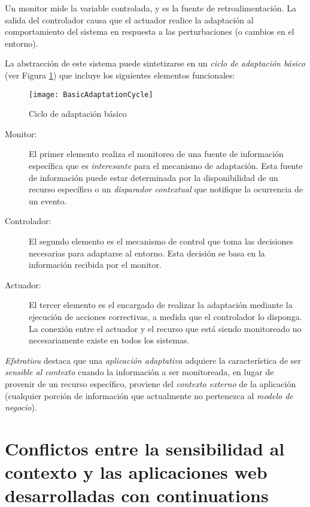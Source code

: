 Un monitor mide la variable controlada, y es la fuente de retroalimentación. La salida del controlador causa que el actuador realice la adaptación al comportamiento del sistema en respuesta a las perturbaciones (o cambios en el entorno).

La abstracción de este sistema puede sintetizarse en un \emph{ciclo de adaptación básico} (ver Figura \ref{BasicAdaptationCycle}) que incluye los siguientes elementos funcionales:

\begin{figure}[ht!]
\centering
\texttt{[image: BasicAdaptationCycle]}
\caption{Ciclo de adaptación básico}
\label{BasicAdaptationCycle}
\end{figure}

\begin{description}
\item[Monitor:] El primer elemento realiza el monitoreo de una fuente de información específica que es \emph{interesante} para el mecanismo de adaptación. Esta fuente de información puede estar determinada por la disponibilidad de un recurso específico o un \emph{disparador contextual} que notifique la ocurrencia de un evento.
\item[Controlador:] El segundo elemento es el mecanismo de control que toma las decisiones necesarias para adaptarse al entorno. Esta decisión se basa en la información recibida por el monitor.
\item[Actuador:] El tercer elemento es el encargado de realizar la adaptación mediante la ejecución de acciones correctivas, a medida que el controlador lo disponga. La conexión entre el actuador y el recurso que está siendo monitoreado no necesariamente existe en todos los sistemas.
\end{description}

\emph{Efstratiou}\cite{Efstratiou04} destaca que una \emph{aplicación adaptativa} adquiere la característica de ser \emph{sensible al contexto} cuando la información a ser monitoreada, en lugar de provenir de un recurso específico, proviene del \emph{contexto externo} de la aplicación (cualquier porción de información que actualmente no pertenezca al \emph{modelo de negocio}).


\section{Conflictos entre la sensibilidad al contexto y las aplicaciones web desarrolladas con continuations}
\label{Conflictos entre sensibilidad y aplicaciones web}

